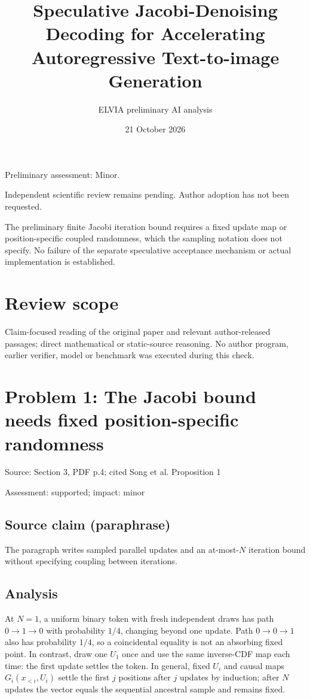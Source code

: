 \documentclass[11pt]{article}
\begin{document}
\title{Speculative Jacobi-Denoising Decoding for Accelerating Autoregressive Text-to-image Generation}

\author{ELVIA preliminary AI analysis}\date{21 October 2026}\maketitle

Preliminary assessment: Minor.\par

Independent scientific review remains pending. Author adoption has not been requested.

The preliminary finite Jacobi iteration bound requires a fixed update map or position-specific coupled randomness, which the sampling notation does not specify. No failure of the separate speculative acceptance mechanism or actual implementation is established.

\section*{Review scope}

Claim-focused reading of the original paper and relevant author-released passages; direct mathematical or static-source reasoning. No author program, earlier verifier, model or benchmark was executed during this check.

\section*{Problem 1: The Jacobi bound needs fixed position-specific randomness}

Source: Section 3, PDF p.4; cited Song et al. Proposition 1

Assessment: supported; impact: minor

\subsection*{Source claim (paraphrase)}

The paragraph writes sampled parallel updates and an at-most-\(N\) iteration bound without specifying coupling between iterations.

\subsection*{Analysis}

At \(N=1\), a uniform binary token with fresh independent draws has path \(0\to1\to0\) with probability \(1/4\), changing beyond one update. Path \(0\to0\to1\) also has probability \(1/4\), so a coincidental equality is not an absorbing fixed point. In contrast, draw one \(U_1\) once and use the same inverse-CDF map each time: the first update settles the token. In general, fixed \(U_i\) and causal maps \(G_i(x_{<i},U_i)\) settle the first \(j\) positions after \(j\) updates by induction; after \(N\) updates the vector equals the sequential ancestral sample and remains fixed.
\end{document}
